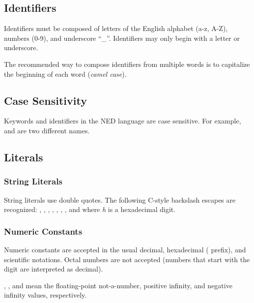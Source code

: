 \subsection{Identifiers}
\label{sec:ned-ref:identifiers}

Identifiers must be composed of letters of the English alphabet (a-z, A-Z),
numbers (0-9), and underscore ``\_''. Identifiers may only begin with a
letter or underscore.

The recommended way to compose identifiers from multiple words is to
capitalize the beginning of each word (\textit{camel case}).


\subsection{Case Sensitivity}
\label{sec:ned-ref:case-sensitivity}

Keywords and identifiers in the NED language are case sensitive. For example,
 and  are two different names.


\subsection{Literals}
\label{sec:ned-ref:literals}

\subsubsection{String Literals}
\label{sec:ned-ref:string-literals}

String literals use double quotes. The following C-style backslash escapes
are recognized: , ,
, , ,
\ttt{{\textbackslash}{\textbackslash}}, , and
 where \textit{h} is a hexadecimal digit.

\subsubsection{Numeric Constants}
\label{sec:ned-ref:numeric-constants}

Numeric constants are accepted in the usual decimal, hexadecimal ( prefix),
and scientific notations. Octal numbers are not accepted (numbers that start
with the  digit are interpreted as decimal).

, , and \ttt{-} mean the floating-point
not-a-number, positive infinity, and negative infinity values, respectively.

